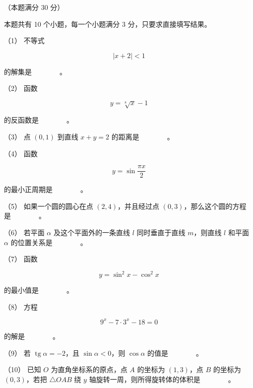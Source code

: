 \begin{question}
（本题满分 30 分）

本题共有 10 个小题，每一个小题满分 3 分，只要求直接填写结果。

（1） 不等式

\nopagebreak[4]
\[
|x+2|<1
\]

的解集是　　　　。

（2） 函数

\nopagebreak[4]
\[
y=\sqrt[8]{x}-1
\]

的反函数是　　　　。

（3） 点 $(0,1)$ 到直线 $x+y=2$ 的距离是　　　　。

（4） 函数

\nopagebreak[4]
\[
y=\sin\frac{\pi x}{2}
\]

的最小正周期是　　　　。

（5） 如果一个圆的圆心在点 $(2,4)$，并且经过点 $(0,3)$，那么这个圆的方程是　　　　。

（6） 若平面 $\alpha$ 及这个平面外的一条直线 $l$ 同时垂直于直线 $m$，则直线 $l$ 和平面 $\alpha$ 的位置关系是　　　　。

（7） 函数

\nopagebreak[4]
\[
y=\sin^2x-\cos^2x
\]

的最小值是　　　　。

（8） 方程

\nopagebreak[4]
\[
9^x-7\cdot3^x-18=0
\]

的解是　　　　。

（9） 若 $\operatorname{tg}\alpha=-2$，且 $\sin\alpha<0$，则 $\cos\alpha$ 的值是　　　　。

（10） 已知 $O$ 为直角坐标系的原点，点 $A$ 的坐标为 $(1,3)$，点 $B$ 的坐标为 $(0,3)$，若把 $\triangle OAB$ 绕 $y$ 轴旋转一周，则所得旋转体的体积是　　　　。

\end{question}
